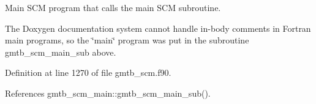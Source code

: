 Main S\+CM program that calls the main S\+CM subroutine. 

The Doxygen documentation system cannot handle in-\/body comments in Fortran main programs, so the \char`\"{}main\char`\"{} program was put in the subroutine gmtb\+\_\+scm\+\_\+main\+\_\+sub above. 

Definition at line 1270 of file gmtb\+\_\+scm.\+f90.



References gmtb\+\_\+scm\+\_\+main\+::gmtb\+\_\+scm\+\_\+main\+\_\+sub().

